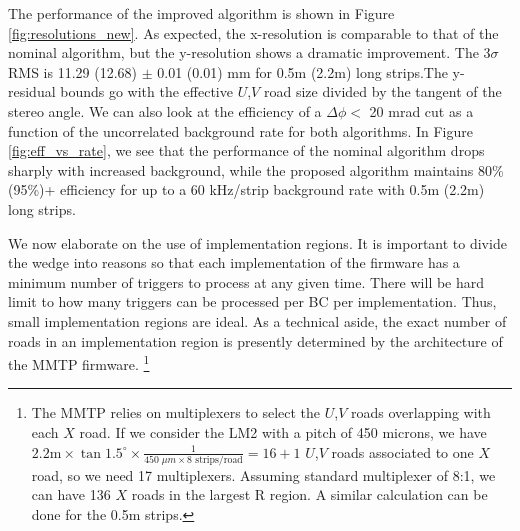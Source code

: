 \par The performance of the improved algorithm is shown in Figure \ref{fig:resolutions_new}. As expected, the x-resolution is comparable to that of the nominal algorithm, but the y-resolution shows a dramatic improvement. The 3$\sigma$ RMS is 11.29 (12.68) $\pm$ 0.01 (0.01) mm for 0.5m (2.2m) long strips.The y-residual bounds go with the effective $U$,$V$ road size divided by the tangent of the stereo angle. We can also look at the efficiency of a $\Delta \phi <$ 20 mrad cut as a function of the uncorrelated background rate for both algorithms. In Figure \ref{fig:eff_vs_rate}, we see that the performance of the nominal algorithm drops sharply with increased background, while the proposed algorithm maintains 80\% (95\%)+ efficiency for up to a 60 kHz/strip background rate with 0.5m (2.2m) long strips.
\par We now elaborate on the use of implementation regions. It is important to divide the wedge into reasons so that each implementation of the firmware has a minimum number of triggers to process at any given time. There will be hard limit to how many triggers can be processed per BC per implementation. Thus, small implementation regions are ideal. As a technical aside, the exact number of roads in an implementation region is presently determined by the architecture of the MMTP firmware. \footnote{The MMTP relies on multiplexers to select the $U$,$V$ roads overlapping with each $X$ road. If we consider the LM2 with a pitch of 450 microns, we have $2.2\text{m} \times \tan 1.5^\circ \times \frac{1}{450 \;\mu m \times 8 \text{ strips/road}} = 16 + 1$ $U$,$V$ roads associated to one $X$ road, so we need 17 multiplexers. Assuming standard multiplexer of 8:1, we can have 136 $X$ roads in the largest R region. A similar calculation can be done for the 0.5m strips.} 

